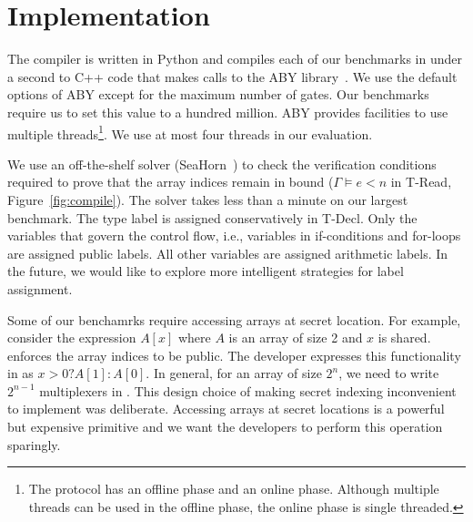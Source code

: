 \section{Implementation}
\label{sec:impl}
The  \tool compiler is written in Python and
compiles each of our benchmarks in under a second to C++ code that makes calls to the ABY
library~\cite{aby}. We use the default options of ABY except 
for the maximum number of gates.  Our benchmarks require us to set this value to a
hundred million. ABY provides facilities to use multiple threads\footnote{The protocol has an offline phase and an online phase. Although multiple threads can be used in the offline phase, the online phase is single threaded.}.
We use at most four threads in our evaluation.

We use an off-the-shelf solver
(SeaHorn~\cite{seahorn}) to check the verification conditions required
to prove that the array indices remain in bound ($\Gamma\vDash e < n$ in {\sc T-Read}, Figure~\ref{fig:compile}). The solver takes less
than a minute on our largest benchmark.
The type label is assigned conservatively in  {\sc T-Decl}.
Only the variables that govern the control flow, i.e., variables
in if-conditions and for-loops are assigned public labels.
All other variables are assigned arithmetic labels.
In the future, we would like to explore more intelligent strategies for label assignment.

Some of our benchamrks require accessing arrays at secret location.
For example, consider the expression $A[x]$ where $A$ is an array of size 2 and $x$ is shared.
\tool enforces the array indices to be public. The developer expresses this functionality in \tool
as $x > 0 ? A[1] : A[0]$. In general, for an array of size $2^n$, we need to write $2^{n-1}$ multiplexers
in \tool. This design choice of making secret indexing inconvenient to implement was deliberate.
Accessing arrays at secret locations is a powerful but expensive primitive
and we want the developers to perform this operation sparingly. 

